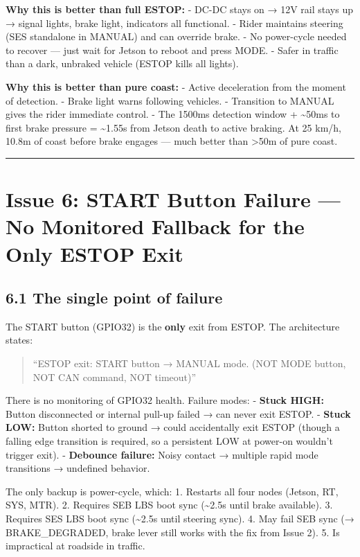 \documentclass[12pt,a4paper,oneside]{report}
\begin{document}
\textbf{Why this is better than full ESTOP:} - DC-DC stays on → 12V rail stays
up → signal lights, brake light, indicators all functional. - Rider maintains
steering (SES standalone in MANUAL) and can override brake. - No power-cycle
needed to recover --- just wait for Jetson to reboot and press MODE. - Safer in
traffic than a dark, unbraked vehicle (ESTOP kills all lights).

\textbf{Why this is better than pure coast:} - Active deceleration from the
moment of detection. - Brake light warns following vehicles. - Transition to
MANUAL gives the rider immediate control. - The 1500ms detection window +
\textasciitilde50ms to first brake pressure = \textasciitilde1.55s from Jetson
death to active braking. At 25 km/h, 10.8m of coast before brake engages ---
much better than \textgreater50m of pure coast.

\begin{center}\rule{0.5\linewidth}{0.5pt}\end{center}

\section{Issue 6: START Button Failure --- No Monitored Fallback for the Only
ESTOP
Exit}\label{issue-6-start-button-failure-no-monitored-fallback-for-the-only-estop-exit}

\subsection{6.1 The single point of failure}\label{the-single-point-of-failure}

The START button (GPIO32) is the \textbf{only} exit from ESTOP. The architecture
states:

\begin{quote}
``ESTOP exit: START button → MANUAL mode. (NOT MODE button, NOT CAN command, NOT
timeout)''
\end{quote}

There is no monitoring of GPIO32 health. Failure modes: - \textbf{Stuck HIGH:}
Button disconnected or internal pull-up failed → can never exit ESTOP. -
\textbf{Stuck LOW:} Button shorted to ground → could accidentally exit ESTOP
(though a falling edge transition is required, so a persistent LOW at power-on
wouldn't trigger exit). - \textbf{Debounce failure:} Noisy contact → multiple
rapid mode transitions → undefined behavior.

The only backup is power-cycle, which: 1. Restarts all four nodes (Jetson, RT,
SYS, MTR). 2. Requires SEB LBS boot sync (\textasciitilde2.5s until brake
available). 3. Requires SES LBS boot sync (\textasciitilde2.5s until steering
sync). 4. May fail SEB sync (→ BRAKE\_DEGRADED, brake lever still works with the
fix from Issue 2). 5. Is impractical at roadside in traffic.
\end{document}
